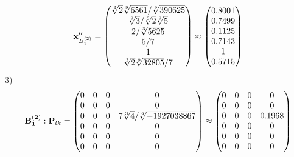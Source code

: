 \documentclass[10pt,a4paper]{article}
\begin{document}
	\[
		\bold{x}''_{B_1^{(2)}} = 
		\begin{pmatrix}
			{\sqrt[3]{2}\sqrt[9]{6561}} / {\sqrt[9]{390625}} \\
			{\sqrt[9]{3}} / {\sqrt[3]{2}\sqrt[9]{5}} \\
			{{2}} / {\sqrt[3]{5625}} \\
			{{5}} / {{7}} \\
			{1}{} \\
			{\sqrt[3]{2}\sqrt[9]{32805}} / {{7}} \\
		\end{pmatrix}
		\approx
		\begin{pmatrix}
			0.8001   \\
			0.7499   \\
			0.1125   \\
			0.7143   \\
			1        \\
			0.5715   \\
		\end{pmatrix}
	\]
	3)
	\[
		\bold{B_1^{(2)}}: \bold{P}_{lk} = 
		\begin{pmatrix}
			{{0}}{} & {{0}}{} & {{0}}{} & {{0}}{} \\
			{{0}}{} & {{0}}{} & {{0}}{} & {{0}}{} \\
			{{0}}{} & {{0}}{} & {{0}}{} & {{7}\sqrt[3]{4}} / {\sqrt[9]{-1927038867}} \\
			{{0}}{} & {{0}}{} & {{0}}{} & {{0}}{} \\
			{{0}}{} & {{0}}{} & {{0}}{} & {{0}}{} \\
			{{0}}{} & {{0}}{} & {{0}}{} & {{0}}{} \\
		\end{pmatrix}
		\approx
		\begin{pmatrix}
			0        & 0        & 0        & 0        \\
			0        & 0        & 0        & 0        \\
			0        & 0        & 0        & 0.1968   \\
			0        & 0        & 0        & 0        \\
			0        & 0        & 0        & 0        \\
			0        & 0        & 0        & 0        \\
		\end{pmatrix}
	\]
\end{document}
